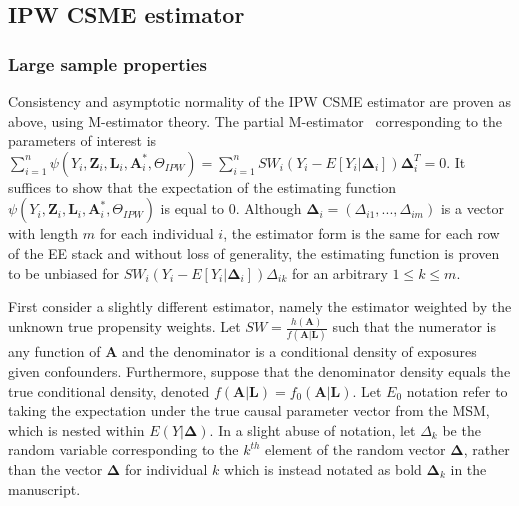 \documentclass[12pt]{article}
\begin{document}
\subsection{IPW CSME estimator}

\subsubsection{Large sample properties}

Consistency and asymptotic normality of the IPW CSME estimator are proven as above, using M-estimator theory. The partial M-estimator~\citep{stefanski2002} corresponding to the parameters of interest is $\sum_{i=1}^{n} \psi(Y_{i}, \bm{Z}_{i}, \bm{L}_{i}, \bm{A}^{*}_{i}, \Theta_{IPW}) = \sum_{i=1}^{n} SW_{i}(Y_{i} - E[Y_{i} | \bm{\Delta}_{i}])\bm{\Delta}_{i}^{T} = 0$. It suffices to show that the expectation of the estimating function $\psi(Y_{i}, \bm{Z}_{i}, \bm{L}_{i}, \bm{A}^{*}_{i}, \Theta_{IPW})$ is equal to 0. Although $\bm{\Delta}_{i} = (\Delta_{i1}, ..., \Delta_{im})$ is a vector with length $m$ for each individual $i$, the estimator form is the same for each row of the EE stack and without loss of generality, the estimating function is proven to be unbiased for $SW_{i}(Y_{i} - E[Y_{i} | \bm{\Delta}_{i}])\Delta_{ik}$ for an arbitrary $1 \leq k \leq m$.

First consider a slightly different estimator, namely the estimator weighted by the unknown true propensity weights. Let $SW = \frac{h(\bm{A})}{f(\bm{A} | \bm{L})}$ such that the numerator is any function of $\bm{A}$ and the denominator is a conditional density of exposures given confounders. Furthermore, suppose that the denominator density equals the true conditional density, denoted $f(\bm{A} | \bm{L}) = f_{0}(\bm{A} | \bm{L})$. Let $E_{0}$ notation refer to taking the expectation under the true causal parameter vector from the MSM, which is nested within $E(Y | \bm{\Delta})$. In a slight abuse of notation, let $\Delta_{k}$ be the random variable corresponding to the $k^{th}$ element of the random vector $\bm{\Delta}$, rather than the vector $\bm{\Delta}$ for individual $k$ which is instead notated as bold $\bm{\Delta}_{k}$ in the manuscript.
\end{document}
